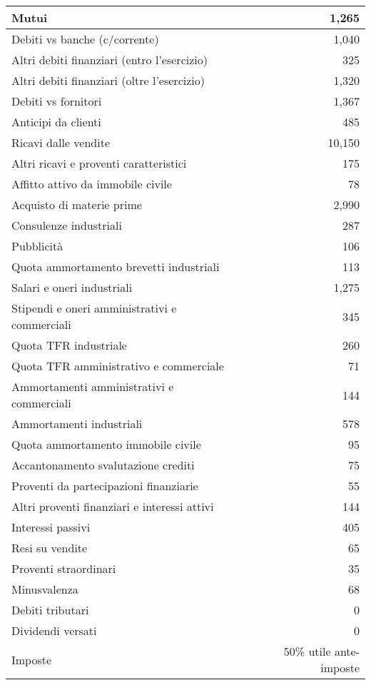 \documentclass{book}
\begin{document}
\begin{longtable}{|l|r|}
    \hline
    Mutui & 1,265 \\
    \hline
    Debiti vs banche (c/corrente) & 1,040 \\
    \hline
    Altri debiti finanziari (entro l’esercizio) & 325 \\
    \hline
    Altri debiti finanziari (oltre l’esercizio) & 1,320 \\
    \hline
    Debiti vs fornitori & 1,367 \\
    \hline
    Anticipi da clienti & 485 \\
    \hline
    Ricavi dalle vendite & 10,150 \\
    \hline
    Altri ricavi e proventi caratteristici & 175 \\
    \hline
    Affitto attivo da immobile civile & 78 \\
    \hline
    Acquisto di materie prime & 2,990 \\
    \hline
    Consulenze industriali & 287 \\
    \hline
    Pubblicità & 106 \\
    \hline
    Quota ammortamento brevetti industriali & 113 \\
    \hline
    Salari e oneri industriali & 1,275 \\
    \hline
    Stipendi e oneri amministrativi e commerciali & 345 \\
    \hline
    Quota TFR industriale & 260 \\
    \hline
    Quota TFR amministrativo e commerciale & 71 \\
    \hline
    Ammortamenti amministrativi e commerciali & 144 \\
    \hline
    Ammortamenti industriali & 578 \\
    \hline
    Quota ammortamento immobile civile & 95 \\
    \hline
    Accantonamento svalutazione crediti & 75 \\
    \hline
    Proventi da partecipazioni finanziarie & 55 \\
    \hline
    Altri proventi finanziari e interessi attivi & 144 \\
    \hline
    Interessi passivi & 405 \\
    \hline
    Resi su vendite & 65 \\
    \hline
    Proventi straordinari & 35 \\
    \hline
    Minusvalenza & 68 \\
    \hline
    Debiti tributari & 0 \\
    \hline
    Dividendi versati & 0 \\
    \hline
    Imposte & 50\% utile ante-imposte \\
    \hline
\end{longtable}
\label{tab:bilancio}
\end{document}
